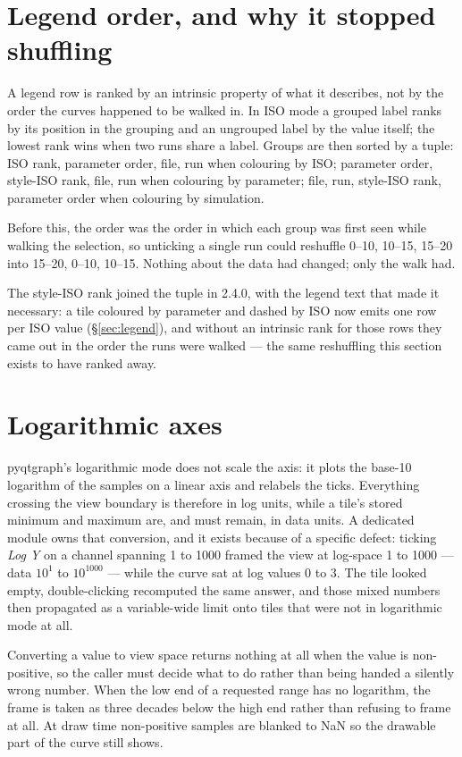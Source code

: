 \documentclass[11pt,a4paper,oneside]{report}
\newcommand{\appver}{2.4.0}
\begin{document}
\section{Legend order, and why it stopped shuffling}

A legend row is ranked by an intrinsic property of what it describes, not by the
order the curves happened to be walked in. In ISO mode a grouped label ranks by
its position in the grouping and an ungrouped label by the value itself; the
lowest rank wins when two runs share a label. Groups are then sorted by a tuple:
ISO rank, parameter order, file, run when colouring by ISO; parameter order,
style-ISO rank, file, run when colouring by parameter; file, run, style-ISO
rank, parameter order when colouring by simulation.

Before this, the order was the order in which each group was first seen while
walking the selection, so unticking a single run could reshuffle 0--10, 10--15,
15--20 into 15--20, 0--10, 10--15. Nothing about the data had changed; only the
walk had.

The style-ISO rank joined the tuple in \appver, with the legend text that made
it necessary: a tile coloured by parameter and dashed by ISO now emits one row
per ISO value (\S\ref{sec:legend}), and without an intrinsic rank for those rows
they came out in the order the runs were walked --- the same reshuffling this
section exists to have ranked away.

\section{Logarithmic axes}

pyqtgraph's logarithmic mode does not scale the axis: it plots the base-10
logarithm of the samples on a linear axis and relabels the ticks. Everything
crossing the view boundary is therefore in log units, while a tile's stored
minimum and maximum are, and must remain, in data units. A dedicated module owns
that conversion, and it exists because of a specific defect: ticking \emph{Log
Y} on a channel spanning 1 to 1000 framed the view at log-space 1 to 1000 ---
data $10^1$ to $10^{1000}$ --- while the curve sat at log values 0 to 3. The
tile looked empty, double-clicking recomputed the same answer, and those mixed
numbers then propagated as a variable-wide limit onto tiles that were not in
logarithmic mode at all.

Converting a value to view space returns nothing at all when the value is
non-positive, so the caller must decide what to do rather than being handed a
silently wrong number. When the low end of a requested range has no logarithm,
the frame is taken as three decades below the high end rather than refusing to
frame at all. At draw time non-positive samples are blanked to NaN so the
drawable part of the curve still shows.
\end{document}

